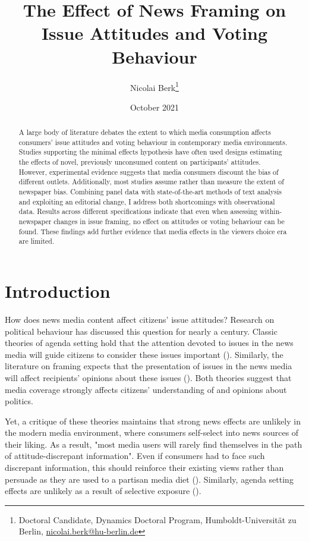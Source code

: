 \documentclass{article}
\title{The Effect of News Framing on Issue Attitudes and Voting Behaviour}
\author{Nicolai Berk\footnote{Doctoral Candidate, Dynamics Doctoral Program, Humboldt-Universität zu Berlin, \href{mailto:nicolai.berk@hu-berlin.de}{nicolai.berk@hu-berlin.de}}}
\date{October 2021}
\begin{document}
\maketitle


\medskip

\begin{abstract}
    A large body of literature debates the extent to which media consumption affects consumers' issue attitudes and voting behaviour in contemporary media environments. Studies supporting the minimal effects hypothesis have often used designs estimating the effects of novel, previously unconsumed content on participants' attitudes. However, experimental evidence suggests that media consumers discount the bias of different outlets. Additionally, most studies assume rather than measure the extent of newspaper bias. Combining panel data with state-of-the-art methods of text analysis and exploiting an editorial change, I address both shortcomings with observational data. Results across different specifications indicate that even when assessing within-newspaper changes in issue framing, no effect on attitudes or voting behaviour can be found. These findings add further evidence that media effects in the viewers choice era are limited.
\end{abstract}


\section{Introduction}


How does news media content affect citizens' issue attitudes? Research on political behaviour has discussed this question for nearly a century. Classic theories of agenda setting hold that the attention devoted to issues in the news media will guide citizens to consider these issues important (\cite{McCombs1972}). Similarly, the literature on framing expects that the presentation of issues in the news media will affect recipients' opinions about these issues (\cite{Nelson1997}). Both theories suggest that media coverage strongly affects citizens' understanding of and opinions about politics.

Yet, a critique of these theories maintains that strong news effects are unlikely in the modern media environment, where consumers self-select into news sources of their liking. As a result, "most media users will rarely find themselves in the path of attitude-discrepant information". Even if consumers had to face such discrepant information, this should reinforce their existing views rather than persuade as they are used to a partisan media diet (\cite[724f]{Bennett2008}). Similarly, agenda setting effects are unlikely as a result of selective exposure (\cite{Lau2021}).
\end{document}
